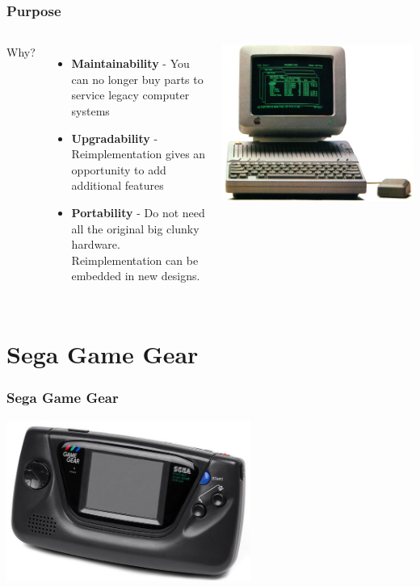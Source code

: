\documentclass{beamer}
\newlength{\wideitemsep}
\let\olditem\item
\renewcommand{\item}{\setlength{\itemsep}{\wideitemsep}\olditem}
\begin{document}
\begin{frame}
    \frametitle{Purpose}

    \begin{columns}[c]
            Why?
            \begin{itemize}
                \item<2-> \textbf{Maintainability} - You can no longer buy parts to service legacy computer systems
                \item<3-> \textbf{Upgradability} - Reimplementation gives an opportunity to add additional features
                \item<4-> \textbf{Portability} - Do not need all the original big clunky hardware. Reimplementation can
                    be embedded in new designs.
            \end{itemize}

            \includegraphics[width=\textwidth]{apple_2.jpg}
    \end{columns}
\end{frame}

\section{Sega Game Gear}
\begin{frame}
    \frametitle{Sega Game Gear}
    \begin{center}
        \includegraphics[width=0.6\textwidth]{gg.jpg}
    \end{center}
\end{frame}
\end{document}
